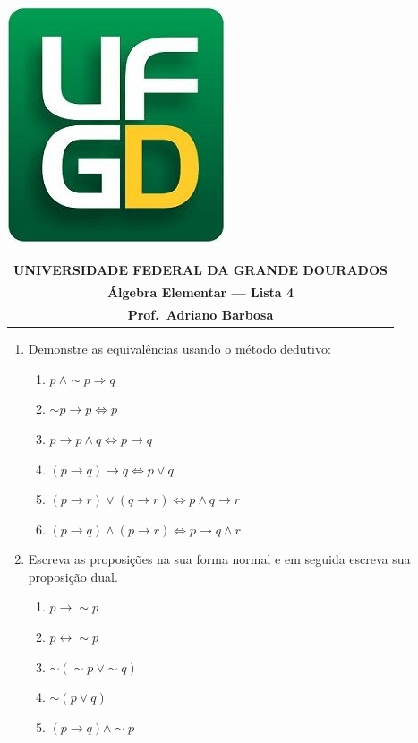 \documentclass[a4paper,5pt]{amsbook}
\newcommand{\ra}{\rightarrow}
\newcommand{\lra}{\leftrightarrow}
\newcommand{\Ra}{\Rightarrow}
\newcommand{\LRa}{\Leftrightarrow}
\renewcommand{\lnot}{\sim}
\begin{document}
\thispagestyle{empty}
\pagestyle{empty}
\begin{minipage}[h]{0.14\textwidth}
	\includegraphics[scale=0.24]{../ufgd.png}
\end{minipage}
\begin{minipage}[h]{\textwidth}
\begin{tabular}{c}
{{\bf UNIVERSIDADE FEDERAL DA GRANDE DOURADOS}}\\
{{\bf \'Algebra Elementar --- Lista 4}}\\
{{\bf Prof.\ Adriano Barbosa}}\\
\end{tabular}
\vspace{-0.45cm}
%
\end{minipage}


\vspace{1cm}
\begin{enumerate}
    \vspace{0.5cm}
    \item Demonstre as equival\^encias usando o m\'etodo dedutivo:
        \begin{enumerate}
            \item $p\ \land \lnot p \Ra q$
            \item $\lnot p \ra p \LRa p$
            \item $p \ra p \land q \LRa p \ra q$
            \item $(p\ra q)\ra q \LRa p\lor q$
            \item $(p\ra r)\lor (q\ra r) \LRa p \land q \ra r$
            \item $(p\ra q)\land (p\ra r) \LRa p\ra q\land r$
        \end{enumerate}

    \vspace{0.5cm}
    \item Escreva as proposi\c{c}\~oes na sua forma normal e em seguida escreva sua
    proposi\c{c}\~ao dual.
        \begin{enumerate}
            \item $p\ra \lnot p$
            \item $p \lra \lnot p$
            \item $\lnot(\lnot p\ \lor \lnot q)$
            \item $\lnot(p \lor q)$
            \item $(p\ra q) \land \lnot p$
        \end{enumerate}
\end{enumerate}
\end{document}
